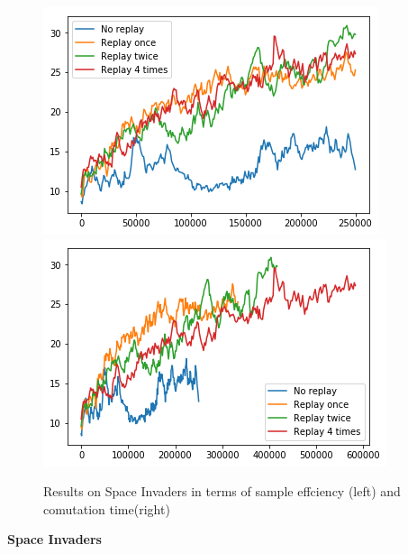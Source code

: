 \begin{figure}[h]
\includegraphics[scale=0.55]{bilder/spaceinvbyonline.png}
\includegraphics[scale=0.55]{bilder/spaceinvbytime.png}
\caption{ Results on Space Invaders in terms of sample effciency (left) and comutation time(right)}
\end{figure}
\textbf{Space Invaders}

